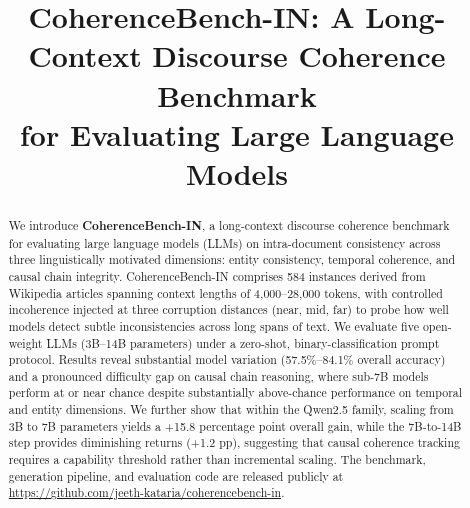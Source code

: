 \documentclass[conference]{IEEEtran}
\begin{document}
\title{CoherenceBench-IN: A Long-Context Discourse Coherence Benchmark\\
for Evaluating Large Language Models}

\author{
  \and
}

\maketitle

\begin{abstract}
We introduce \textbf{CoherenceBench-IN}, a long-context discourse coherence
benchmark for evaluating large language models (LLMs) on intra-document consistency
across three linguistically motivated dimensions: entity consistency, temporal coherence,
and causal chain integrity.
CoherenceBench-IN comprises 584 instances derived from Wikipedia articles
spanning context lengths of 4{,}000--28{,}000 tokens,
with controlled incoherence injected at three corruption distances (near, mid, far)
to probe how well models detect subtle inconsistencies across long spans of text.
We evaluate five open-weight LLMs (3B--14B parameters) under a zero-shot,
binary-classification prompt protocol.
Results reveal substantial model variation (57.5\%--84.1\% overall accuracy)
and a pronounced difficulty gap on causal chain reasoning,
where sub-7B models perform at or near chance despite substantially above-chance performance on temporal and entity dimensions.
We further show that within the Qwen2.5 family, scaling from 3B to 7B parameters
yields a +15.8 percentage point overall gain,
while the 7B-to-14B step provides diminishing returns (+1.2 pp),
suggesting that causal coherence tracking requires a capability threshold
rather than incremental scaling.
The benchmark, generation pipeline, and evaluation code are released publicly at \url{https://github.com/jeeth-kataria/coherencebench-in}.
\end{abstract}
\end{document}
